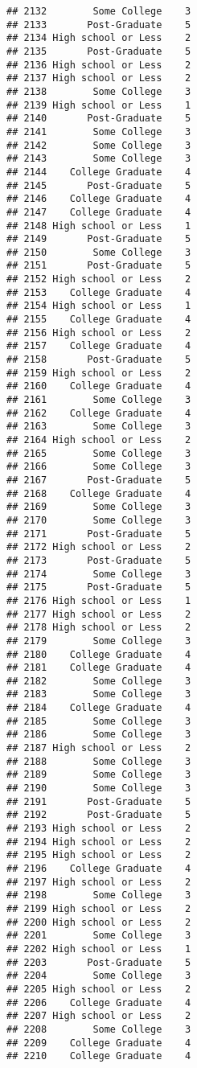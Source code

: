 \documentclass[
]{article}
\begin{document}
\begin{verbatim}
## 2132        Some College    3
## 2133       Post-Graduate    5
## 2134 High school or Less    2
## 2135       Post-Graduate    5
## 2136 High school or Less    2
## 2137 High school or Less    2
## 2138        Some College    3
## 2139 High school or Less    1
## 2140       Post-Graduate    5
## 2141        Some College    3
## 2142        Some College    3
## 2143        Some College    3
## 2144    College Graduate    4
## 2145       Post-Graduate    5
## 2146    College Graduate    4
## 2147    College Graduate    4
## 2148 High school or Less    1
## 2149       Post-Graduate    5
## 2150        Some College    3
## 2151       Post-Graduate    5
## 2152 High school or Less    2
## 2153    College Graduate    4
## 2154 High school or Less    1
## 2155    College Graduate    4
## 2156 High school or Less    2
## 2157    College Graduate    4
## 2158       Post-Graduate    5
## 2159 High school or Less    2
## 2160    College Graduate    4
## 2161        Some College    3
## 2162    College Graduate    4
## 2163        Some College    3
## 2164 High school or Less    2
## 2165        Some College    3
## 2166        Some College    3
## 2167       Post-Graduate    5
## 2168    College Graduate    4
## 2169        Some College    3
## 2170        Some College    3
## 2171       Post-Graduate    5
## 2172 High school or Less    2
## 2173       Post-Graduate    5
## 2174        Some College    3
## 2175       Post-Graduate    5
## 2176 High school or Less    1
## 2177 High school or Less    2
## 2178 High school or Less    2
## 2179        Some College    3
## 2180    College Graduate    4
## 2181    College Graduate    4
## 2182        Some College    3
## 2183        Some College    3
## 2184    College Graduate    4
## 2185        Some College    3
## 2186        Some College    3
## 2187 High school or Less    2
## 2188        Some College    3
## 2189        Some College    3
## 2190        Some College    3
## 2191       Post-Graduate    5
## 2192       Post-Graduate    5
## 2193 High school or Less    2
## 2194 High school or Less    2
## 2195 High school or Less    2
## 2196    College Graduate    4
## 2197 High school or Less    2
## 2198        Some College    3
## 2199 High school or Less    2
## 2200 High school or Less    2
## 2201        Some College    3
## 2202 High school or Less    1
## 2203       Post-Graduate    5
## 2204        Some College    3
## 2205 High school or Less    2
## 2206    College Graduate    4
## 2207 High school or Less    2
## 2208        Some College    3
## 2209    College Graduate    4
## 2210    College Graduate    4

\end{verbatim}
\end{document}
